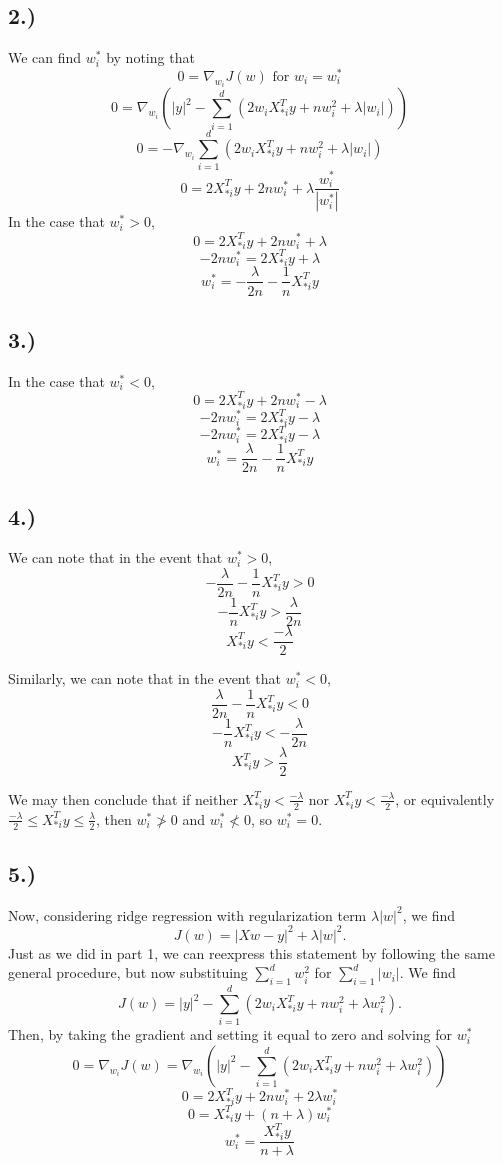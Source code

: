 \documentclass{report}
\begin{document}
\subsection*{2.)}

We can find $w_i^*$ by noting that 
$$ 0 = \nabla_{w_i} J(w) \text{ for } w_i = w_i^* $$
$$ 0 = \nabla_{w_i} \left( |y|^2 - \sum_{i=1}^d{\left( 2 w_i X_{*i}^T y +  n w_i^2 + \lambda |w_i| \right)} \right) $$
$$ 0 = -\nabla_{w_i} \sum_{i=1}^d{ \left( 2 w_i X_{*i}^T y +  n w_i^2 + \lambda |w_i| \right)} $$
$$ 0 = 2 X_{*i}^T y +  2 n w_i^* + \lambda \frac{w_i^*}{|w_i^*|} $$
In the case that $w_i^* > 0$, 
$$ 0 = 2 X_{*i}^T y +  2 n w_i^* + \lambda $$
$$ -2 n w_i^* = 2X_{*i}^T y + \lambda $$
$$ w_i^* = - \frac{\lambda}{2n} - \frac{1}{n}X_{*i}^T y $$


\subsection*{3.)}

In the case that $w_i^* < 0$, 
$$ 0 = 2 X_{*i}^T y +  2 n w_i^* - \lambda $$
$$ -2 n w_i^* = 2X_{*i}^T y - \lambda $$
$$ -2 n w_i^* = 2X_{*i}^T y - \lambda $$
$$ w_i^* =  \frac{\lambda}{2n} - \frac{1}{n}X_{*i}^T y $$


\subsection*{4.)}

We can note that in the event that $w_i^* > 0$,
$$ - \frac{\lambda}{2n} - \frac{1}{n}X_{*i}^T y > 0 $$
$$ - \frac{1}{n}X_{*i}^T y > \frac{\lambda}{2n}  $$
$$ X_{*i}^T y < \frac{-\lambda}{2}  $$

Similarly, we can note that in the event that $w_i^* < 0$,
$$ \frac{\lambda}{2n} - \frac{1}{n}X_{*i}^T y < 0$$
$$ -\frac{1}{n}X_{*i}^T y < -\frac{\lambda}{2n} $$
$$ X_{*i}^T y > \frac{\lambda}{2} $$

We may then conclude that if neither $X_{*i}^T y < \frac{-\lambda}{2}$ nor $X_{*i}^T y < \frac{-\lambda}{2}$, or equivalently $\frac{-\lambda}{2} \leq X_{*i}^T y  \leq \frac{\lambda}{2}$, then  $w_i^* \ngtr 0$ and $w_i^* \nless 0$, so $w_i^* = 0$.


\subsection*{5.)}

Now, considering ridge regression with regularization term $\lambda|w|^2$, we find
$$ J(w) = |Xw-y|^2 + \lambda |w|^2 .$$
Just as we did in part 1, we can reexpress this statement by following the same general procedure, but now substituing $\sum_{i=1}^d{w_i^2}$ for $\sum_{i=1}^d{|w_i|}$. We find
$$ J(w) = |y|^2 - \sum_{i=1}^d{\left( 2 w_i X_{*i}^T y +  n w_i^2 + \lambda w_i^2 \right)}. $$
Then, by taking the gradient and setting it equal to zero and solving for $w_i^*$
$$ 0 = \nabla_{w_i}  J(w) = \nabla_{w_i} \left( |y|^2 - \sum_{i=1}^d{\left( 2 w_i X_{*i}^T y +  n w_i^2 + \lambda w_i^2 \right)} \right) $$
$$ 0 =   2 X_{*i}^T y +  2 n w_i^* + 2 \lambda w_i^* $$
$$ 0 =   X_{*i}^T y +  (n + \lambda) w_i^* $$
$$ w_i^* =   \frac{X_{*i}^T y}{n + \lambda} $$
\end{document}
